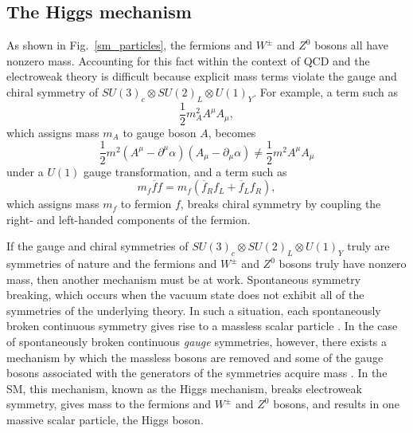 \subsection{The Higgs mechanism}
As shown in Fig.~\ref{sm_particles}, the fermions and $W^{\pm}$ and $Z^{0}$ bosons all have nonzero mass. Accounting for this fact within the context of QCD and the electroweak theory is difficult because explicit mass terms violate the gauge and chiral symmetry of $SU(3)_{c} \otimes SU(2)_{L} \otimes U(1)_{Y}$. For example, a term such as
\begin{equation}
    \frac{1}{2}m_{A}^{2}A^{\mu}A_{\mu},
\end{equation}
which assigns mass $m_{A}$ to gauge boson $A$, becomes
\begin{equation}
    \frac{1}{2}m^{2}(A^{\mu}-\partial^{\mu}\alpha)(A_{\mu}-\partial_{\mu}\alpha) \neq \frac{1}{2}m^{2}A^{\mu}A_{\mu}
\end{equation}
under a $U(1)$ gauge transformation, and a term such as
\begin{equation}
    m_{f}\overline{f}f = m_{f}(\overline{f}_{R}f_{L} + \overline{f}_{L}f_{R}),
\end{equation}
which assigns mass $m_{f}$ to fermion $f$, breaks chiral symmetry by coupling the right- and left-handed components of the fermion.

If the gauge and chiral symmetries of $SU(3)_{c} \otimes SU(2)_{L} \otimes U(1)_{Y}$ truly are symmetries of nature and the fermions and $W^{\pm}$ and $Z^{0}$ bosons truly have nonzero mass, then another mechanism must be at work. Spontaneous symmetry breaking, which occurs when the vacuum state does not exhibit all of the symmetries of the underlying theory. In such a situation, each spontaneously broken continuous symmetry gives rise to a massless scalar particle \cite{goldstone_salam_weinberg}. In the case of spontaneously broken continuous \textit{gauge} symmetries, however, there exists a mechanism by which the massless bosons are removed and some of the gauge bosons associated with the generators of the symmetries acquire mass \cite{englert, higgs, kibble}. In the SM, this mechanism, known as the Higgs mechanism, breaks electroweak symmetry, gives mass to the fermions and $W^{\pm}$ and $Z^{0}$ bosons, and results in one massive scalar particle, the Higgs boson.

